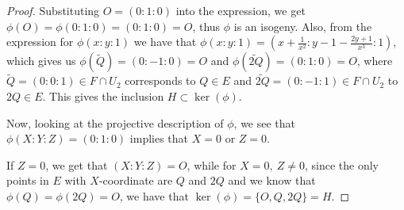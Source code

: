 \documentclass{article}
\newcommand{\exercise}[1]{\noindent {\bf Exercise #1}}
\begin{document}
\begin{proof}
    Substituting $O=(0:1:0)$ into the expression, we get
    $\phi(O)=\phi(0:1:0)=(0:1:0)=O$, thus $\phi$ is an isogeny. Also, from the
    expression for $\phi(x:y:1)$
    we have that $\phi(x:y:1)=(x+\frac{1}{x^2}:y-1-\frac{2y+1}{x^3}:1)$,
    which gives us $\phi(\tilde{Q})=(0:-1:0)=O$ and
    $\phi(\tilde{2Q})=(0:1:0)=O$, where $\tilde{Q}=(0:0:1)\in F\cap U_2$
    corresponds to $Q\in E$ and $\tilde{2Q}=(0:-1:1)\in F\cap U_2$ to $2Q\in E$.
    This gives the inclusion $H\subset\ker(\phi)$.

    Now, looking at the projective description of $\phi$, we see that
    $\phi(X:Y:Z)=(0:1:0)$ implies that $X=0$ or $Z=0$.

    If $Z=0$, we get that $(X:Y:Z)=O$, while for $X=0,\ Z\neq 0$, since the only
    points in $E$ with $X$-coordinate are $Q$ and $2Q$ and we know that
    $\phi(Q)=\phi(2Q)=O$, we have that $\ker(\phi)=\{O,Q,2Q\}=H$.
\end{proof}



~\\
\exercise{4}
\end{document}

